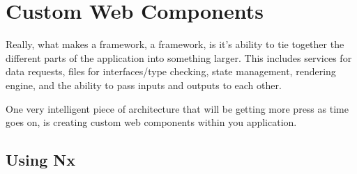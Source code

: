 \chapter{ Custom Web Components }
Really, what makes a framework, a framework, is it's ability to tie together the different parts of the application into something larger. This includes services for data requests, files for interfaces/type checking, state management, rendering engine, and the ability to pass inputs and outputs to each other.

One very intelligent piece of architecture that will be getting more press as time goes on, is creating custom web components within you application.

\section{Using Nx}